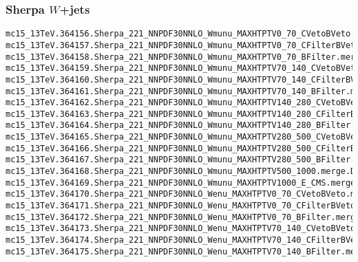 \begin{scriptsize}
\subsubsection{Sherpa $W$+jets}
\tiny
\begin{verbatim}
mc15_13TeV.364156.Sherpa_221_NNPDF30NNLO_Wmunu_MAXHTPTV0_70_CVetoBVeto.merge.DAOD_HIGG5D2.e5340_s2726_r7772_r7676_p2949
mc15_13TeV.364157.Sherpa_221_NNPDF30NNLO_Wmunu_MAXHTPTV0_70_CFilterBVeto.merge.DAOD_HIGG5D2.e5340_s2726_r7772_r7676_p2949
mc15_13TeV.364158.Sherpa_221_NNPDF30NNLO_Wmunu_MAXHTPTV0_70_BFilter.merge.DAOD_HIGG5D2.e5340_s2726_r7772_r7676_p2949
mc15_13TeV.364159.Sherpa_221_NNPDF30NNLO_Wmunu_MAXHTPTV70_140_CVetoBVeto.merge.DAOD_HIGG5D2.e5340_s2726_r7772_r7676_p2949
mc15_13TeV.364160.Sherpa_221_NNPDF30NNLO_Wmunu_MAXHTPTV70_140_CFilterBVeto.merge.DAOD_HIGG5D2.e5340_s2726_r7772_r7676_p2949
mc15_13TeV.364161.Sherpa_221_NNPDF30NNLO_Wmunu_MAXHTPTV70_140_BFilter.merge.DAOD_HIGG5D2.e5340_s2726_r7772_r7676_p2949
mc15_13TeV.364162.Sherpa_221_NNPDF30NNLO_Wmunu_MAXHTPTV140_280_CVetoBVeto.merge.DAOD_HIGG5D2.e5340_s2726_r7772_r7676_p2949
mc15_13TeV.364163.Sherpa_221_NNPDF30NNLO_Wmunu_MAXHTPTV140_280_CFilterBVeto.merge.DAOD_HIGG5D2.e5340_s2726_r7772_r7676_p2949
mc15_13TeV.364164.Sherpa_221_NNPDF30NNLO_Wmunu_MAXHTPTV140_280_BFilter.merge.DAOD_HIGG5D2.e5340_s2726_r7772_r7676_p2949
mc15_13TeV.364165.Sherpa_221_NNPDF30NNLO_Wmunu_MAXHTPTV280_500_CVetoBVeto.merge.DAOD_HIGG5D2.e5340_s2726_r7772_r7676_p2949
mc15_13TeV.364166.Sherpa_221_NNPDF30NNLO_Wmunu_MAXHTPTV280_500_CFilterBVeto.merge.DAOD_HIGG5D2.e5340_s2726_r7772_r7676_p2949
mc15_13TeV.364167.Sherpa_221_NNPDF30NNLO_Wmunu_MAXHTPTV280_500_BFilter.merge.DAOD_HIGG5D2.e5340_s2726_r7772_r7676_p2949
mc15_13TeV.364168.Sherpa_221_NNPDF30NNLO_Wmunu_MAXHTPTV500_1000.merge.DAOD_HIGG5D2.e5340_s2726_r7772_r7676_p2949
mc15_13TeV.364169.Sherpa_221_NNPDF30NNLO_Wmunu_MAXHTPTV1000_E_CMS.merge.DAOD_HIGG5D2.e5340_s2726_r7772_r7676_p2949
mc15_13TeV.364170.Sherpa_221_NNPDF30NNLO_Wenu_MAXHTPTV0_70_CVetoBVeto.merge.DAOD_HIGG5D2.e5340_s2726_r7772_r7676_p2949
mc15_13TeV.364171.Sherpa_221_NNPDF30NNLO_Wenu_MAXHTPTV0_70_CFilterBVeto.merge.DAOD_HIGG5D2.e5340_s2726_r7772_r7676_p2949
mc15_13TeV.364172.Sherpa_221_NNPDF30NNLO_Wenu_MAXHTPTV0_70_BFilter.merge.DAOD_HIGG5D2.e5340_s2726_r7772_r7676_p2949
mc15_13TeV.364173.Sherpa_221_NNPDF30NNLO_Wenu_MAXHTPTV70_140_CVetoBVeto.merge.DAOD_HIGG5D2.e5340_s2726_r7772_r7676_p2949
mc15_13TeV.364174.Sherpa_221_NNPDF30NNLO_Wenu_MAXHTPTV70_140_CFilterBVeto.merge.DAOD_HIGG5D2.e5340_s2726_r7772_r7676_p2949
mc15_13TeV.364175.Sherpa_221_NNPDF30NNLO_Wenu_MAXHTPTV70_140_BFilter.merge.DAOD_HIGG5D2.e5340_s2726_r7772_r7676_p2949

\end{verbatim}
\end{scriptsize}
